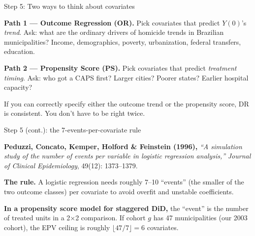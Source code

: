 \documentclass[aspectratio=169,12pt,t]{beamer}
\begin{document}
\begin{frame}{Step 5: Two ways to think about covariates}
\vspace{0.4cm}

\textbf{Path 1 --- Outcome Regression (OR).} \;Pick covariates that predict $Y(0)$'s \textit{trend}. \;Ask: what are the ordinary drivers of homicide trends in Brazilian municipalities? \;Income, demographics, poverty, urbanization, federal transfers, education.

\vspace{0.5cm}

\textbf{Path 2 --- Propensity Score (PS).} \;Pick covariates that predict \textit{treatment timing}. \;Ask: who got a CAPS first? \;Larger cities? \;Poorer states? \;Earlier hospital capacity?

\vspace{0.5cm}

 \;If you can correctly specify either the outcome trend or the propensity score, DR is consistent. \;You don't have to be right twice.

\vspace{0.4em}
\end{frame}

\begin{frame}{Step 5 (cont.): the 7-events-per-covariate rule}
\vspace{0.4cm}

\textbf{Peduzzi, Concato, Kemper, Holford \& Feinstein (1996),} \;\textit{``A simulation study of the number of events per variable in logistic regression analysis,''} \;\textit{Journal of Clinical Epidemiology}, 49(12): 1373--1379.

\vspace{0.4cm}

\textbf{The rule.} \;A logistic regression needs roughly 7--10 ``events'' (the smaller of the two outcome classes) per covariate to avoid overfit and unstable coefficients.

\vspace{0.4cm}

\textbf{In a propensity score model for staggered DiD,} the ``event'' is the number of treated units in a 2$\times$2 comparison. \;If cohort $g$ has 47 municipalities (our 2003 cohort), the EPV ceiling is roughly $\lfloor 47/7 \rfloor = 6$ covariates.

\vspace{0.4em}
\end{frame}
\end{document}

